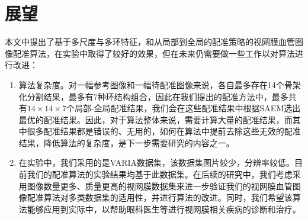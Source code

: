 \section{展望}
本文中提出了基于多尺度与多环特征，和从局部到全局的配准策略的视网膜血管图像配准算法，在实验中取得了较好的效果，但在未来仍需要做一些工作以对算法进行改进：
\begin{enumerate}
\item 算法复杂度。对一幅参考图像和一幅待配准图像来说，各自最多存在14个骨架化分割结果，最多有7种环结构组合，因此在我们提出的配准方法中，最多共有$14\times14\times7$个局部-全局配准结果，我们会在这些配准结果中根据SAEM选出最优的配准结果。因此，对于算法整体来说，需要计算大量的配准结果，而其中很多配准结果都是错误的、无用的，如何在算法中提前去除这些无效的配准结果，降低算法的复杂度，是下一步需要研究的内容之一。
\item 在实验中，我们采用的是VARIA数据集，该数据集图片较少，分辨率较低。目前我们的配准算法的实验结果均基于此数据集。在后续的研究中，我们考虑采用图像数量更多、质量更高的视网膜数据集来进一步验证我们的视网膜血管图像配准算法对多类数据集的适用性，并进行算法的改进。同时，我们希望该算法能够应用到实际中，以帮助眼科医生等进行视网膜相关疾病的诊断和治疗。
\end{enumerate}

